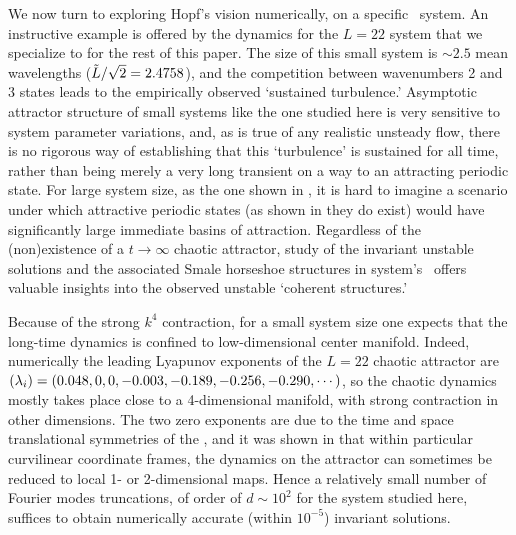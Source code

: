 

We now turn to exploring Hopf's vision
numerically, on a specific \KS\ system.
An instructive example is offered by the dynamics for
the  $L=22$  system
that we specialize to for the rest of this paper.
The size of this
small system is $\sim 2.5$ mean wavelengths
($\tilde{L}/\sqrt{2}= 2.4758$),
and the competition between wavenumbers 2 and 3 states
leads to the empirically observed `sustained turbulence.'
Asymptotic attractor structure of small systems like
the one studied here
is very sensitive to system parameter variations, and,
as is true of
any realistic unsteady flow, there is no rigorous way of
establishing that this `turbulence' is sustained for all time,
rather than being
merely a very long transient on a way to an
attracting periodic state.
For large system size, as the one shown in , it is
hard to imagine a scenario under which attractive periodic states
(as shown in  they do exist) would have significantly
large immediate basins of attraction.
Regardless of the
(non)existence of a $t \to \infty$ chaotic attractor, study
of the invariant unstable solutions and the associated Smale
horseshoe structures in system's \statesp\ offers valuable
insights into the observed unstable `coherent structures.'

Because of the strong $k^4$ contraction, for a small system size
one expects that the long-time dynamics is confined to low-dimensional
center manifold. Indeed, numerically the leading Lyapunov exponents of the
$L=22$ chaotic attractor are
$(\lambda_i) = (0.048, 0, 0, -0.003, -0.189, -0.256, -0.290, \cdots)$,
so the chaotic dynamics mostly takes
place close to a 4-dimensional manifold, with strong
contraction in other dimensions.  The two zero exponents
are due to the
time and space translational symmetries of the \KSe,
and it was shown in 
that within particular curvilinear coordinate frames, the
dynamics on the attractor can sometimes be reduced to
local 1- or 2-dimensional maps.
Hence a relatively small
number of Fourier modes truncations, of order of $d \sim 10^2$
for the system studied here, suffices to obtain
numerically accurate (within $10^{-5}$) invariant
solutions.


